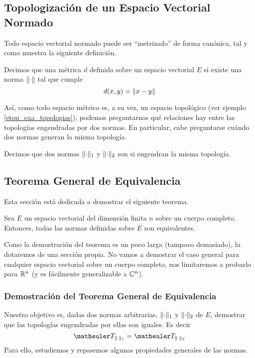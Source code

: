 \subsection{Topologización de un Espacio Vectorial Normado}
Todo espacio vectorial normado puede ser ``metrizado'' de forma canónica, tal y como muestra la siguiente definición.
\begin{defi}
	Decimos que una métrica $d$ definida sobre un espacio vectorial $E$  si existe una norma $\lVert\cdot\rVert$ tal que cumple
	\begin{equation*}
		d(x,y)=\lVert x-y\rVert
	\end{equation*}
\end{defi}
Así, como todo espacio métrico es, a su vez, un espacio topológico (ver ejemplo \ref{etop_exa_topologias}), podemos preguntarnos qué relaciones hay entre las topologías engendradas por dos normas. En particular, cabe preguntarse cuándo dos normas generan la misma topología.
\begin{defi}
	Decimos que dos normas $\lVert\cdot\rVert_1$ y $\lVert\cdot\rVert_2$ son  si engendran la misma topología.
\end{defi}
\subsection{Teorema General de Equivalencia}
Esta sección está dedicada a demostrar el siguiente teorema.
\begin{theo}
	Sea $E$ un espacio vectorial del dimensión finita $n$ sobre un cuerpo completo. Entonces, todas las normas definidas sobre $E$ son equivalentes.
\end{theo}
Como la demostración del teorema es un poco larga (tampoco demasiado), la dotaremos de una sección propia. No vamos a demostrar el caso general para cualquier espacio vectorial sobre un cuerpo completo, nos limitaremos a probarlo para $\mathbb{R}^n$ (y es fácilmente generalizable a $\mathbb{C}^n$).

\subsubsection{Demostración del Teorema General de Equivalencia}
Nuestro objetivo es, dadas dos normas arbitrarias, $\lVert\cdot\rVert_1$ y $\lVert\cdot\rVert_2$ de $E$, demostrar que las topologías engendradas por ellas son iguales. Es decir
\begin{equation*}
\T_{\norm{\cdot}_1}=\T_{\norm{\cdot}_2}
\end{equation*}
Para ello, estudiemos y repasemos algunas propiedades generales de las normas.

